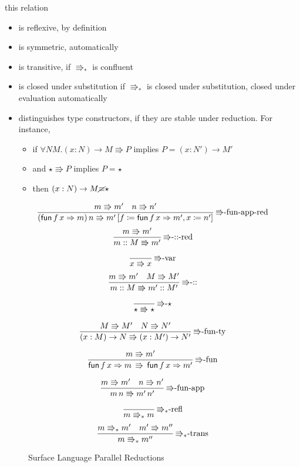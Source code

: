 this relation 
\begin{itemize}
\item is reflexive, by definition
\item is symmetric, automatically
\item is transitive, if $\Rrightarrow_{\ast}$ is confluent
\item is closed under substitution if $\Rrightarrow_{\ast}$ is closed under
substitution, closed under evaluation automatically
\item distinguishes type constructors, if they are stable under reduction.
For instance,
\begin{itemize}
\item if $\forall NM.\left(x:N\right)\rightarrow M\Rrightarrow P$ implies $P=\left(x:N'\right)\rightarrow M'$
\item and $\star\Rrightarrow P$ implies $P=\star$
\item then $\left(x:N\right)\rightarrow M\cancel{\equiv}\star$
\end{itemize}
\end{itemize}
\begin{figure}
\[
\frac{m\Rrightarrow m'\quad n\Rrightarrow n'}{\left(\mathsf{fun}\,f\,x\Rightarrow m\right)n\Rrightarrow m'\left[f\coloneqq\mathsf{fun}\,f\,x\Rightarrow m',x\coloneqq n'\right]}\,\textrm{\ensuremath{\Rrightarrow}-fun-app-red}
\]
\[
\frac{m\Rrightarrow m'}{m::M\Rrightarrow m'}\,\textrm{\ensuremath{\Rrightarrow}-::-red}
\]

\[
\frac{\,}{x\Rrightarrow x}\,\textrm{\ensuremath{\Rrightarrow}-var}
\]
\[
\frac{m\Rrightarrow m'\quad M\Rrightarrow M'}{m::M\Rrightarrow m'::M'}\,\textrm{\ensuremath{\Rrightarrow}-::}
\]

\[
\frac{\,}{\star\Rrightarrow\star}\,\textrm{\ensuremath{\Rrightarrow}-}\star
\]

\[
\frac{M\Rrightarrow M'\quad N\Rrightarrow N'}{\left(x:M\right)\rightarrow N\Rrightarrow\left(x:M'\right)\rightarrow N'}\,\textrm{\ensuremath{\Rrightarrow}-fun-ty}
\]

\[
\frac{m\Rrightarrow m'}{\mathsf{fun}\,f\,x\Rightarrow m\,\Rrightarrow\,\mathsf{fun}\,f\,x\Rightarrow m'}\,\textrm{\ensuremath{\Rrightarrow}-fun}
\]

\[
\frac{m\Rrightarrow m'\quad n\Rrightarrow n'}{m\,n\Rrightarrow m'\,n'}\,\textrm{\ensuremath{\Rrightarrow}-fun-app}
\]

\[
\frac{\,}{m\Rrightarrow_{\ast}m}\,\textrm{\ensuremath{\Rrightarrow_{\ast}}-refl}
\]
\[
\frac{m\Rrightarrow_{\ast}m'\quad m'\Rrightarrow m''}{m\Rrightarrow_{\ast}m''}\,\textrm{\ensuremath{\Rrightarrow_{\ast}}-trans}
\]

\caption{Surface Language Parallel Reductions}
\label{fig:surface-reduction}
\end{figure}
  
